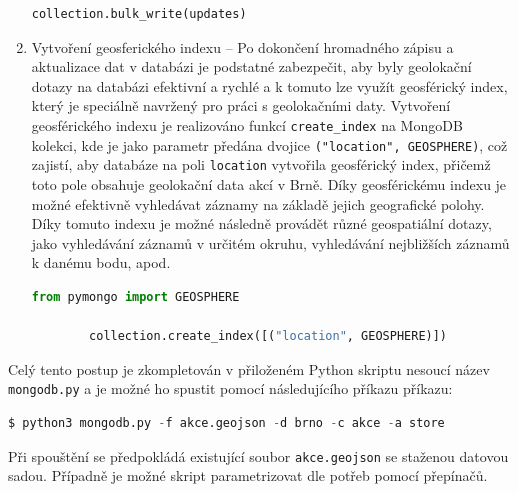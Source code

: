 \documentclass[a4paper, 11pt]{article}
\begin{document}
\begin{enumerate}
\begin{lstlisting}[style=Python, language=Python, framesep=10pt]
        collection.bulk_write(updates)
        \end{lstlisting}
        \item Vytvoření geosferického indexu -- Po dokončení hromadného zápisu a aktualizace dat v databázi je podstatné zabezpečit, aby byly geolokační dotazy na databázi efektivní a rychlé a k tomuto lze využít geosférický index, který je speciálně navržený pro práci s geolokačními daty. Vytvoření geosférického indexu je realizováno funkcí \texttt{create\_index} na MongoDB kolekci, kde je jako parametr předána dvojice \texttt{("location", GEOSPHERE)}, což zajistí, aby databáze na poli \texttt{location} vytvořila geosférický index, přičemž toto pole obsahuje geolokační data akcí v Brně. Díky geosférickému indexu je možné efektivně vyhledávat záznamy na základě jejich geografické polohy. Díky tomuto indexu je možné následně provádět různé geospatiální dotazy, jako vyhledávání záznamů v určitém okruhu, vyhledávání nejbližších záznamů k danému bodu, apod.
        \begin{lstlisting}[style=Python, language=Python, framesep=10pt]
        from pymongo import GEOSPHERE

        collection.create_index([("location", GEOSPHERE)])
        \end{lstlisting}
        
    \end{enumerate}
    Celý tento postup je zkompletován v přiloženém Python skriptu nesoucí název \texttt{mongodb.py} a je možné ho spustit pomocí 
    následujícího příkazu příkazu:
    \begin{lstlisting}[style=Python, language=Python, framesep=10pt]
        $ python3 mongodb.py -f akce.geojson -d brno -c akce -a store
    \end{lstlisting}
    Při spouštění se předpokládá existující soubor \texttt{akce.geojson} se staženou datovou sadou. Případně je možné skript parametrizovat dle potřeb pomocí přepínačů.
    
\end{document}
